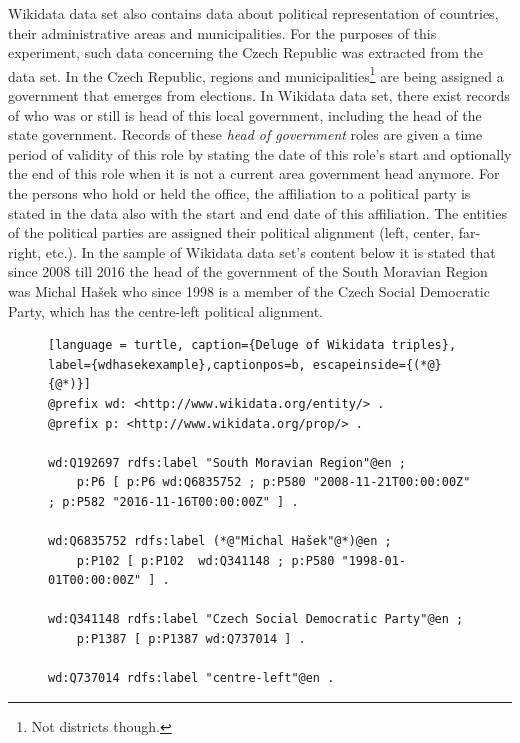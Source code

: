 Wikidata data set also contains data about political representation of countries, their administrative areas and municipalities. For the purposes of this experiment, such data concerning the Czech Republic was extracted from the data set. In the Czech Republic, regions and municipalities\footnote{Not districts though.} are being assigned a government that emerges from elections. In Wikidata data set, there exist records of who was or still is head of this local government, including the head of the state government. Records of these \textit{head of government} roles are given a time period of validity of this role by stating the date of this role's start and optionally the end of this role when it is not a current area government head anymore. For the persons who hold or held the office, the affiliation to a political party is stated in the data also with the start and end date of this affiliation. The entities of the political parties are assigned their political alignment (left, center, far-right, etc.). In the sample of Wikidata data set's content below it is stated that since 2008 till 2016 the head of the government of the South Moravian Region was Michal Hašek who since 1998 is a member of the Czech Social Democratic Party, which has the centre-left political alignment.

\begin{figure}[h]
\begin{lstlisting}[language = turtle, caption={Deluge of Wikidata triples}, label={wdhasekexample},captionpos=b, escapeinside={(*@}{@*)}]
@prefix wd: <http://www.wikidata.org/entity/> .
@prefix p: <http://www.wikidata.org/prop/> .

wd:Q192697 rdfs:label "South Moravian Region"@en ;
    p:P6 [ p:P6 wd:Q6835752 ; p:P580 "2008-11-21T00:00:00Z" ; p:P582 "2016-11-16T00:00:00Z" ] .

wd:Q6835752 rdfs:label (*@"Michal Hašek"@*)@en ;
    p:P102 [ p:P102  wd:Q341148 ; p:P580 "1998-01-01T00:00:00Z" ] .

wd:Q341148 rdfs:label "Czech Social Democratic Party"@en ;
    p:P1387 [ p:P1387 wd:Q737014 ] .

wd:Q737014 rdfs:label "centre-left"@en .
\end{lstlisting}
\end{figure}

